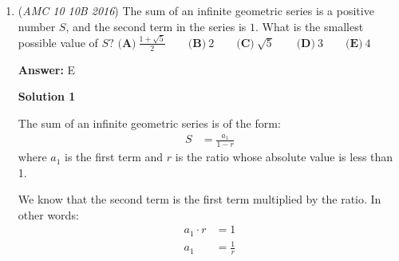 \begin{enumerate}
 



\textbf{Solution 3 (not rigorous)}

First let the numbers be
 \[1   ~8~   7\]
 \[2  ~ 9   ~6\]
 \[3  ~ 4~   5\]with the numbers $1-8$ around the outsides and $9$ in the middle. We see that the sum of the four corner numbers is $16$. If we switch $7$ and $9$, then the corner numbers will add up to $18$ and the consecutive numbers will still be touching each other. The answer is $\boxed {\textbf{(C) }7}$. ~edited

 



\textbf{Solution 4 (answer choices)}

Testing out the box with the center square taking on the value of 5 and 6, we find that they either do not satisfy the first or the second condition. Testing 7, we find that a valid configuration is
 \[1 ~8~ 9\]
 \[2 ~ 7 ~6\]
 \[3 ~ 4~ 5\]
$\boxed {\textbf{(C) }7}$




\textbf{Solution 5}

There are $10$ cases of integers $1-9$ adding to $18$. Like Solution 1, you realize that all the dark squares are all odd numbers, and the only case with all odd numbers is $1,3,5,9$, meaning that the center square is $\boxed {\textbf{(C) }7}$



	\item (\textit{AMC 10 10B 2016}) The sum of an infinite geometric series is a positive number $S$, and the second term in the series is $1$. What is the smallest possible value of $S?$
$\textbf{(A)}\ \frac{1+\sqrt{5}}{2} \qquad \textbf{(B)}\ 2 \qquad \textbf{(C)}\ \sqrt{5} \qquad \textbf{(D)}\ 3 \qquad \textbf{(E)}\ 4$

 \textbf{Answer: }E



\textbf{Solution 1}

The sum of an infinite geometric series is of the form:
 \[\begin{split} S & = \frac{a_1}{1-r}  \end{split}\]where $a_1$ is the first term and $r$ is the ratio whose absolute value is less than 1.

 We know that the second term is the first term multiplied by the ratio. In other words:
 \[\begin{split} a_1 \cdot r & = 1 \\ a_1 & = \frac{1}{r} \end{split}\]


\end{enumerate}

